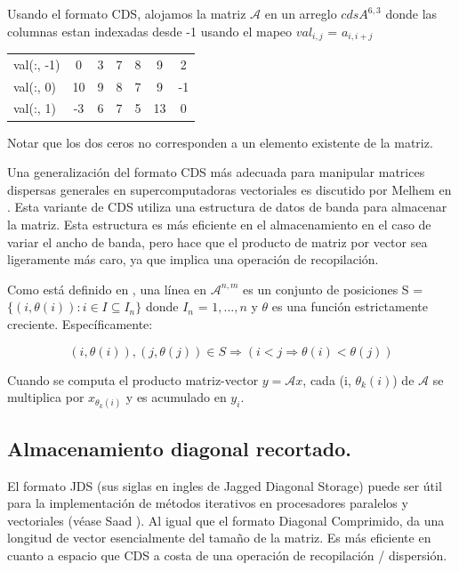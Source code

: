 \documentclass[a4paper,openright,12pt, oneside]{book}
\newcommand{\implica}{\Rightarrow}
\begin{document}
Usando el formato CDS, alojamos la matriz $\mathcal{A}$ en un arreglo \textit{$cdsA^{6, 3}$} donde las columnas estan indexadas desde -1 usando el mapeo $val_{i, j}$ = $a_{i, i+j}$

\begin{tabular}{ l || c | c | c | c | c | c}
  val(:, -1) & 0 & 3 & 7 & 8 & 9 & 2 \\
  val(:, 0) & 10 & 9 & 8 & 7 & 9 & -1 \\
  val(:, 1) & -3 & 6 & 7 & 5 & 13 & 0 \\
\end{tabular}

Notar que los dos ceros no corresponden a un elemento existente de la matriz.

Una generalizaci\'on del formato CDS m\'as adecuada para manipular matrices dispersas generales en supercomputadoras vectoriales es discutido por Melhem en \cite{MELHEM}. Esta variante de CDS utiliza una estructura de datos de banda para almacenar la matriz. Esta estructura es m\'as eficiente en el almacenamiento en el caso de variar el ancho de banda, pero hace que el producto de  matriz por vector sea ligeramente m\'as caro, ya que implica una operaci\'on de recopilaci\'on.

Como est\'a definido en \cite{MELHEM}, una l\'inea en $\mathcal{A}^{n,m}$ es un conjunto de posiciones 
S = $\{(i, \theta(i)): i \in I \subseteq I_{n} \}$ donde $I_{n}$ = ${1, ..., n}$ y $\theta$ es una funci\'on estrictamente creciente. Espec\'ificamente: 


$$(i, \theta(i)), (j, \theta(j)) \in S \implica (i < j \implica \theta(i) < \theta(j)) $$

Cuando se computa el producto matriz-vector $ y = \mathcal{A}x $, cada (i, $\theta_{k}(i)$) de $\mathcal{A}$ se multiplica por $x_{\theta_{k}(i)}$ y es acumulado en $y_{i}$.

\subsection{Almacenamiento diagonal recortado.}

El formato JDS (sus siglas en ingles de Jagged Diagonal Storage) puede ser \'util para la implementaci\'on de m\'etodos iterativos en procesadores paralelos y vectoriales (v\'ease Saad \cite{JDS}). Al igual que el formato Diagonal Comprimido, da una longitud de vector esencialmente del tama\~no de la matriz. Es m\'as eficiente en cuanto a espacio que CDS a costa de una operaci\'on de recopilaci\'on / dispersi\'on.
\end{document}
